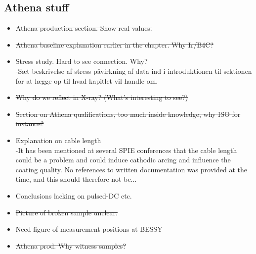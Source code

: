 \subsection{Athena stuff}
\begin{itemize}

	\item \st{ Athena production section. Show real values.}
	\item \st{Athena baseline explanation earlier in the chapter. Why Ir/B4C?}
	\item Stress study. Hard to see connection. Why?\\
      -Sæt beskrivelse af stress påvirkning af data ind i introduktionen til sektionen for at lægge op til hvad kapitlet vil handle om.
	\item \st{Why do we reflect in X-ray? (What's interesting to see?)}\\

	\item \st{Section on Athena qualifications, too much inside knowledge, why ISO for instance?}\\

	\item Explanation on cable length\\
      -It has been mentioned at several SPIE conferences that the cable length could be a problem and could induce cathodic arcing and influence the coating quality. No references to written documentation was provided at the time, and this should therefore not be...
	\item Conclusions lacking on pulsed-DC etc.
	\item \st{Picture of broken sample unclear.}
	\item \st{Need figure of measurement positions at BESSY}
	\item \st{Athena prod. Why witness samples?}\\


\end{itemize}

